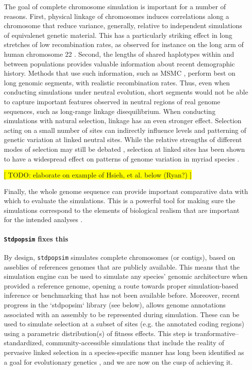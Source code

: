 \documentclass[hidelinks]{article}
\newcommand{\Stdpopsim}{\texttt{Stdpopsim}\xspace}
\newcommand{\stdpopsim}{\texttt{stdpopsim}\xspace}
\begin{document}
The goal of complete chromosome simulation is important for a number of reasons.
First, physical linkage of chromosomes induces correlations along a chromosome that
reduce variance, generally, relative to independent simulations of equivalenet genetic material.
This has a particularly striking effect in long stretches of low recombination rates,
as observed for instance on the long arm of human chromosome 22 \citep{Dawson2002}.
Second, the lengths of shared haplotypes within and
between populations provides valuable information about recent demographic history.
Methods that use such information, such as MSMC \citep{Schiffels2020}, perform best
on long genomic segments, with realistic recombination rates.
Thus, even when conducting simulations under neutral evolution, short segments
would not be able to capture important features observed in neutral regions of
real genome sequences, such as long-range linkage disequilibrium.
%
When conducting simulations with natural selection, linkage has
an even stronger effect. Selection acting on a small number of sites can
indirectly influence levels and patterning of genetic variation at linked
neutral sites. While the relative strengths of different modes of selection
may still be debated \citep{kern2018neutral,jensen2019importance}, 
selection at linked sites has been shown to have a widespread
effect on patterns of genome variation in myriad species
\citep[e.g.,][]{McVicker2009,Charlesworth2012}.

\noindent\colorbox{yellow}
{[ TODO: elaborate on example of Hsieh, et al. below (Ryan?) ]}

Finally, the whole genome sequence can provide important comparative
data with which to evaluate the simulations. This is a powerful tool for
making sure the simulations correspond to the elements of biological
realism that are important for the intended analyses \citep{Hsieh2016a}. 

\paragraph*{\Stdpopsim fixes this}
By design, \stdpopsim simulates complete chromosomes (or contigs),
based on asseblies of references genomes that are publicly available. 
This means that the simulation engine can be used to simulate any species'
genomic architecture when provided a reference genome, opening a route towards
proper simulation-based inference or benchmarking that has not been available before.
Moreover, recent progress in the `stdpopsim` library (see below), allows
genome annotations associated with an assembly to be represented during simulation.
These can be used to simulate selection at a subset of sites (e.g. the annotated coding regions)
using a parametric distribution(s) of fitness effects.
This step is tranformative-- standardized, community-accessible simulations
that include the reality of pervasive linked selection in a species-specific
manner has long been identified as a goal for evolutionary genetics
\cite[e.g.,][]{McMcVicker2009,comeron2014background}, and we are now 
on the cusp of achieving it. 
\end{document}
